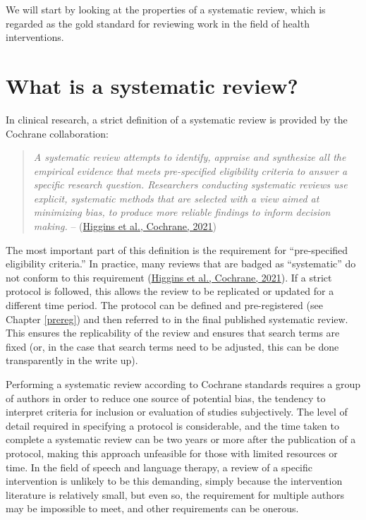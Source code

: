 \documentclass{krantz}
\begin{document}
We will start by looking at the properties of a systematic review, which is regarded as the gold standard for reviewing work in the field of health interventions.

\hypertarget{what-is-a-systematic-review}{%
\section{What is a systematic review?}\label{what-is-a-systematic-review}}

In clinical research, a strict definition of a systematic review is provided by the Cochrane collaboration:

\begin{quote}
\emph{A systematic review attempts to identify, appraise and synthesize all the empirical evidence that meets pre-specified eligibility criteria to answer a specific research question. Researchers conducting systematic reviews use explicit, systematic methods that are selected with a view aimed at minimizing bias, to produce more reliable findings to inform decision making.} -- (\protect\hyperlink{ref-higgins2021}{Higgins et al., Cochrane, 2021})
\end{quote}

The most important part of this definition is the requirement for ``pre-specified eligibility criteria.'' In practice, many reviews that are badged as ``systematic'' do not conform to this requirement (\protect\hyperlink{ref-higgins2021}{Higgins et al., Cochrane, 2021}). If a strict protocol is followed, this allows the review to be replicated or updated for a different time period. The protocol can be defined and pre-registered (see Chapter \ref{prereg}) and then referred to in the final published systematic review. This ensures the replicability of the review and ensures that search terms are fixed (or, in the case that search terms need to be adjusted, this can be done transparently in the write up).

Performing a systematic review according to Cochrane standards requires a group of authors in order to reduce one source of potential bias, the tendency to interpret criteria for inclusion or evaluation of studies subjectively. The level of detail required in specifying a protocol is considerable, and the time taken to complete a systematic review can be two years or more after the publication of a protocol, making this approach unfeasible for those with limited resources or time. In the field of speech and language therapy, a review of a specific intervention is unlikely to be this demanding, simply because the intervention literature is relatively small, but even so, the requirement for multiple authors may be impossible to meet, and other requirements can be onerous.
\end{document}
